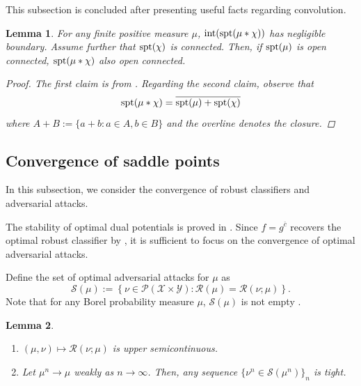 \documentclass{amsart}
\theoremstyle{plain}
\numberwithin{equation}{section}\newtheorem{theorem}{Theorem}[section]
\newtheorem{lemma}[theorem]{Lemma}
\theoremstyle{remark}
\newcommand{\spt}{\textup{spt}}
\begin{document}
This subsection is concluded after presenting useful facts regarding convolution.


\begin{lemma}\label{lem:connectedsupport}
For any finite positive measure $\mu$,  $\mathrm{int}(\spt(\mu*\chi))$ has negligible boundary. Assume further that $\spt(\chi)$ is connected. Then, if $\spt(\mu)$ is open connected, $\spt(\mu*\chi)$ also open connected.


\begin{proof}
The first claim is from \cite[Lemma C.16]{Goldfeld_Kato_Rioux_Sadhu2024}. Regarding the second claim, observe that
\[
    \spt(\mu*\chi) = \overline{\spt(\mu) + \spt(\chi)}
\]
where $A+B:=\{ a+b : a \in A, b \in B\}$ and the overline denotes the closure. 
\end{proof}
\end{lemma}


\subsection{Convergence of saddle points}




In this subsection, we consider the convergence of robust classifiers and adversarial attacks. 


The stability of optimal dual potentials is proved in . Since $f=g^{\overline{c}}$ recovers the optimal robust classifier by , it is sufficient to focus on the convergence of optimal adversarial attacks.





Define the set of optimal adversarial attacks for $\mu$ as
\[
    \mathcal{S}(\mu):= \left\{ \nu \in \mathcal{P}(\mathcal{X} \times \mathcal{Y}) : \mathscr{R}(\mu) = \mathscr{R}(\nu;\mu) \right\}.
\]
Note that for any Borel probability measure $\mu$, $\mathcal{S}(\mu)$ is not empty \cite[Proposition 7]{jakwang_MOT}.
 



\begin{lemma}\label{lem: adversary's lemma}
\quad
\begin{enumerate}
    \item[(i)] $(\mu,\nu) \mapsto \mathscr{R}(\nu; \mu)$ is upper semicontinuous. %
    \item[(ii)] Let $\mu^n \to \mu$ weakly as $n \to \infty$. Then, any sequence $\{ \nu^n \in \mathcal{S}(\mu^n)\}_{n}$ is tight.
\end{enumerate}
\end{lemma}
\end{document}
